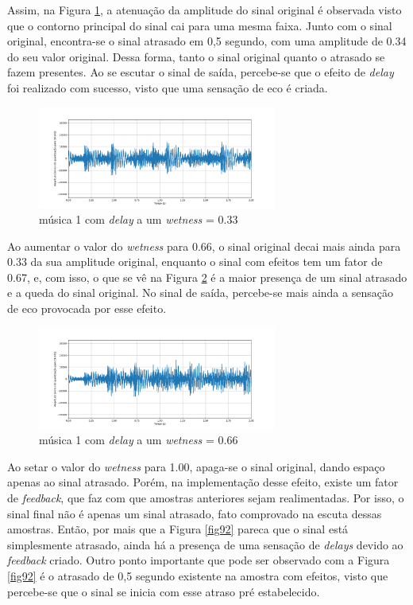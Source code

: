 Assim, na Figura \ref{fig90}, a atenuação da amplitude do sinal original é observada visto que o contorno principal do sinal cai para uma mesma faixa. Junto com o sinal original, encontra-se o sinal atrasado em 0,5 segundo, com uma amplitude de 0.34 do seu valor original. Dessa forma, tanto o sinal original quanto o atrasado se fazem presentes. Ao se escutar o sinal de saída, percebe-se que o efeito de \textit{delay} foi realizado com sucesso, visto que uma sensação de eco é criada. 

\begin{figure}[h]
    \centering
    \includegraphics[width=0.7\textwidth]{figuras/fig90.png}
    \caption{música 1 com \textit{delay} a um \textit{wetness} = 0.33 }
    \label{fig90}
\end{figure}

Ao aumentar o valor do \textit{wetness} para 0.66, o sinal original decai mais ainda para 0.33 da sua amplitude original, enquanto o sinal com efeitos tem um fator de 0.67, e, com isso, o que se vê na Figura \ref{fig91} é a maior presença de um sinal atrasado e a queda do sinal original. No sinal de saída, percebe-se mais ainda a sensação de eco provocada por esse efeito.

\begin{figure}[h]
    \centering
    \includegraphics[width=0.7\textwidth]{figuras/fig91.png}
    \caption{música 1 com \textit{delay} a um \textit{wetness} = 0.66 }
    \label{fig91}
\end{figure}

Ao setar o valor do \textit{wetness} para 1.00, apaga-se o sinal original, dando espaço apenas ao sinal atrasado. Porém, na implementação desse efeito, existe um fator de \textit{feedback}, que faz com que amostras anteriores sejam realimentadas. Por isso, o sinal final não é apenas um sinal atrasado, fato comprovado na escuta dessas amostras. Então, por mais que a Figura \ref{fig92} pareca que o sinal está simplesmente atrasado, ainda há a presença de uma sensação de \textit{delays} devido ao \textit{feedback} criado. Outro ponto importante que pode ser observado com a Figura \ref{fig92} é o atrasado de 0,5 segundo existente na amostra com efeitos, visto que percebe-se que o sinal se inicia com esse atraso pré estabelecido.

